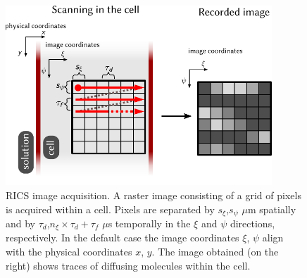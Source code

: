 \begin{figure}%
  \centering
    \includegraphics[width=10cm]{figures/rics_theory_1.pdf}
    \caption[\acs{RICS} image acquisition]{
    \acs{RICS} image acquisition. A raster image
    consisting of a grid of pixels is acquired within a cell. Pixels are
    separated by $s_\xi$,$s_\psi$ $\mu$m spatially and by $\tau_d$,$n_\xi\times
    \tau_d + \tau_f$ $\mu$s temporally in the $\xi$ and $\psi$
    directions,
    respectively. In the default case the image coordinates $\xi$, $\psi$
    align with the physical coordinates $x$, $y$. The image obtained (on
    the right)
    shows traces of diffusing molecules within the cell.}
  \label{fig:rics_theory1}
\end{figure}
